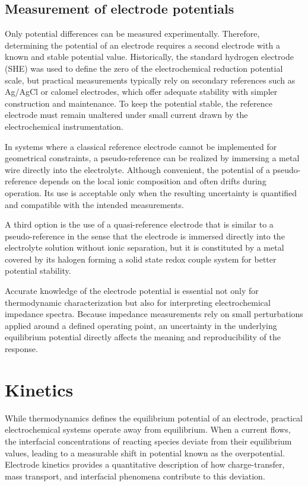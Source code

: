 \subsection{Measurement of electrode potentials}

Only potential differences can be measured experimentally. 
Therefore, determining the potential of an electrode requires a second electrode with a known and stable potential value. 
Historically, the standard hydrogen electrode (SHE) was used to define the zero of the electrochemical reduction potential scale, but practical measurements typically rely on secondary references such as Ag/AgCl or calomel electrodes, which offer adequate stability with simpler construction and maintenance. 
To keep the potential stable, the reference electrode must remain unaltered under small current drawn by the electrochemical instrumentation.

In systems where a classical reference electrode cannot be implemented for geometrical constraints, a pseudo-reference can be realized by immersing a metal wire directly into the electrolyte. Although convenient, the potential of a pseudo-reference depends on the local ionic composition and often drifts during operation. 
Its use is acceptable only when the resulting uncertainty is quantified and compatible with the intended measurements.

A third option is the use of a quasi-reference electrode that is similar to a pseudo-reference in the sense that the electrode is immersed directly into the electrolyte solution without ionic separation, but it is constituted by a metal covered by its halogen forming a solid state redox couple system for better potential stability.

Accurate knowledge of the electrode potential is essential not only for thermodynamic characterization but also for interpreting electrochemical impedance spectra. 
Because impedance measurements rely on small perturbations applied around a defined operating point, an uncertainty in the underlying equilibrium potential directly affects the meaning and reproducibility of the response.

\section{Kinetics}

While thermodynamics defines the equilibrium potential of an electrode, practical electrochemical systems operate away from equilibrium. 
When a current flows, the interfacial concentrations of reacting species deviate from their equilibrium values, leading to a measurable shift in potential known as the overpotential. 
Electrode kinetics provides a quantitative description of how charge-transfer, mass transport, and interfacial phenomena contribute to this deviation.

